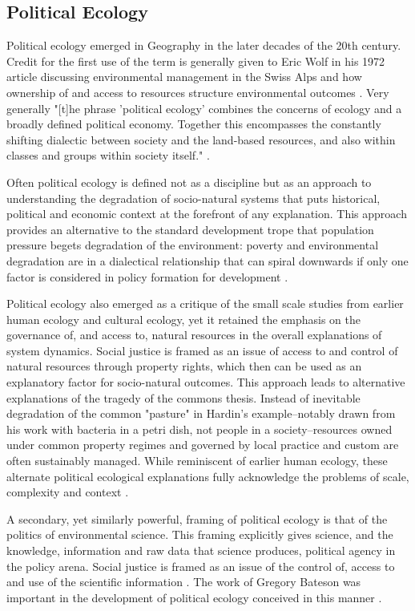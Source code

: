 \subsection{Political Ecology}

Political ecology emerged in Geography in the later decades of the 20th century. Credit for the first use of the term is generally given to Eric Wolf in his 1972 article discussing environmental management in the Swiss Alps and how ownership of and access to resources structure environmental outcomes \citep{wolf_1972}. Very generally "[t]he phrase 'political ecology' combines the concerns of ecology and a broadly defined political economy. Together this encompasses the constantly shifting dialectic between society and the land-based resources, and also within classes and groups within society itself." \citep[][p. 17]{blaikie_1987}. 

Often political ecology is defined not as a discipline but as an approach to understanding the degradation of socio-natural systems that puts historical, political and economic context at the forefront of any explanation. This approach provides an alternative to the standard development trope that population pressure begets degradation of the environment: poverty and environmental degradation are in a dialectical relationship that can spiral downwards if only one factor is considered in policy formation for development \citep{blaikie_1987, peet_1996}.

Political ecology also emerged as a critique of the small scale studies from earlier human ecology and cultural ecology, yet it retained the emphasis on the governance of, and access to, natural resources in the overall explanations of system dynamics. Social justice is framed as an issue of access to and control of natural resources through property rights, which then can be used as an explanatory factor for socio-natural outcomes. This approach leads to alternative explanations of the tragedy of the commons thesis. Instead of inevitable degradation of the common "pasture" in Hardin's example--notably drawn from his work with bacteria in a petri dish, not people in a society--resources owned under common property regimes and governed by local practice and custom are often sustainably managed. While reminiscent of earlier human ecology, these alternate political ecological explanations fully acknowledge the problems of scale, complexity and context \citep{ostrom_1999}. 

A secondary, yet similarly powerful, framing of political ecology is that of the politics of environmental science. This framing explicitly gives science, and the knowledge, information and raw data that science produces, political agency in the policy arena. Social justice is framed as an issue of the control of, access to and use of the scientific information \citep{forsyth_2003,leach_1996}. The work of Gregory Bateson was important in the development of political ecology conceived in this manner \citep{peet_1996}.

